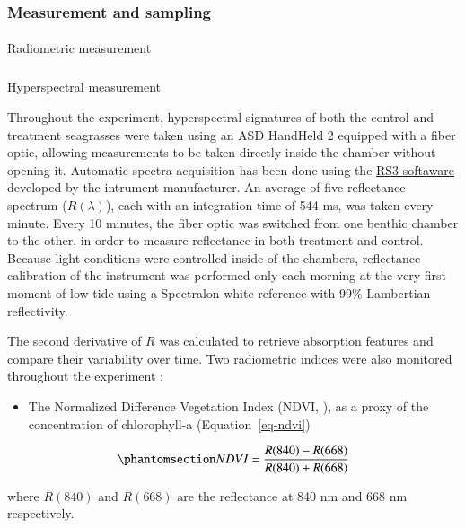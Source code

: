 \documentclass[
  number]{elsarticle}
\makeatletter
\let\oldparagraph\paragraph
\renewcommand{\paragraph}{
    \@ifstar
      \xxxParagraphStar
      \xxxParagraphNoStar
  }
\newcommand{\xxxParagraphStar}[1]{\oldparagraph*{#1}\mbox{}}
\newcommand{\xxxParagraphNoStar}[1]{\oldparagraph{#1}\mbox{}}
\let\oldsubparagraph\subparagraph
\renewcommand{\subparagraph}{
    \@ifstar
      \xxxSubParagraphStar
      \xxxSubParagraphNoStar
  }
\newcommand{\xxxSubParagraphStar}[1]{\oldsubparagraph*{#1}\mbox{}}
\newcommand{\xxxSubParagraphNoStar}[1]{\oldsubparagraph{#1}\mbox{}}
\providecommand{\tightlist}{%
  \setlength{\itemsep}{0pt}\setlength{\parskip}{0pt}}\usepackage{longtable,booktabs,array}
\makeatother
\begin{document}
\subsubsection{Measurement and sampling}\label{measurement-and-sampling}

\paragraph{Radiometric measurement}\label{radiometric-measurement}

\subparagraph{Hyperspectral
measurement}\label{hyperspectral-measurement}

Throughout the experiment, hyperspectral signatures of both the control
and treatment seagrasses were taken using an ASD HandHeld 2 equipped
with a fiber optic, allowing measurements to be taken directly inside
the chamber without opening it. Automatic spectra acquisition has been
done using the
\href{https://www.malvernpanalytical.com/en/learn/knowledge-center/user-manuals/rs3-software-user-manual}{RS3
softaware} developed by the intrument manufacturer. An average of five
reflectance spectrum (\(R(\lambda)\)), each with an integration time of
544 ms, was taken every minute. Every 10 minutes, the fiber optic was
switched from one benthic chamber to the other, in order to measure
reflectance in both treatment and control. Because light conditions were
controlled inside of the chambers, reflectance calibration of the
instrument was performed only each morning at the very first moment of
low tide using a Spectralon white reference with 99\% Lambertian
reflectivity.

The second derivative of \(R\) was calculated to retrieve absorption
features and compare their variability over time. Two radiometric
indices were also monitored throughout the experiment :

\begin{itemize}
\tightlist
\item
  The Normalized Difference Vegetation Index (NDVI,
  \citep{rouse1974monitoring}), as a proxy of the concentration of
  chlorophyll-a (Equation~\ref{eq-ndvi})
\end{itemize}

\begin{equation}\phantomsection\label{eq-ndvi}{
NDVI = \frac{R(840)-R(668)}{R(840)+R(668)}
}\end{equation}

where \(R(840)\) and \(R(668)\) are the reflectance at 840 nm and 668 nm
respectively.
\end{document}

